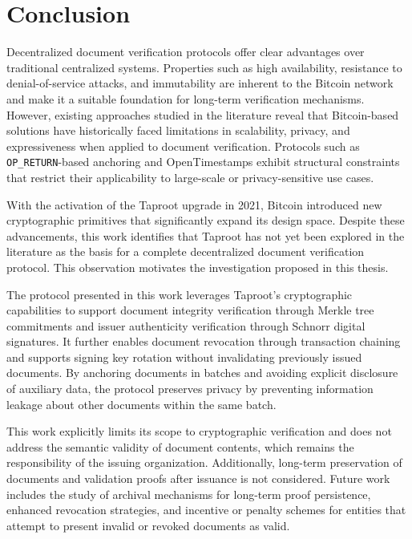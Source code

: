 \section{Conclusion}

Decentralized document verification protocols offer clear advantages over traditional centralized systems.
Properties such as high availability, resistance to denial-of-service attacks, and immutability are inherent to the Bitcoin network and make it a suitable foundation for long-term verification mechanisms.
However, existing approaches studied in the literature reveal that Bitcoin-based solutions have historically faced limitations in scalability, privacy, and expressiveness when applied to document verification.
Protocols such as \texttt{OP\_RETURN}-based anchoring and OpenTimestamps exhibit structural constraints that restrict their applicability to large-scale or privacy-sensitive use cases.

With the activation of the Taproot upgrade in 2021, Bitcoin introduced new cryptographic primitives that significantly expand its design space.
Despite these advancements, this work identifies that Taproot has not yet been explored in the literature as the basis for a complete decentralized document verification protocol.
This observation motivates the investigation proposed in this thesis.

The protocol presented in this work leverages Taproot’s cryptographic capabilities to support document integrity verification through Merkle tree commitments and issuer authenticity verification through Schnorr digital signatures.
It further enables document revocation through transaction chaining and supports signing key rotation without invalidating previously issued documents.
By anchoring documents in batches and avoiding explicit disclosure of auxiliary data, the protocol preserves privacy by preventing information leakage about other documents within the same batch.

This work explicitly limits its scope to cryptographic verification and does not address the semantic validity of document contents, which remains the responsibility of the issuing organization.
Additionally, long-term preservation of documents and validation proofs after issuance is not considered.
Future work includes the study of archival mechanisms for long-term proof persistence, enhanced revocation strategies, and incentive or penalty schemes for entities that attempt to present invalid or revoked documents as valid.
